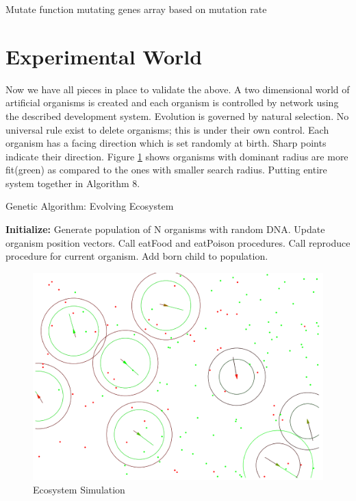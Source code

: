 \documentclass[conference]{IEEEtran}
\begin{document}
\begin{algorithm}
\caption{Mutate function mutating genes array based on mutation rate}
\begin{algorithmic} 
\ELSE
{}
\ENDIF
\ENDIF
\ENDFOR
\end{algorithmic}
\end{algorithm}

\section{Experimental World}
Now we have all pieces in place to validate the above. A two dimensional world of artificial organisms is created and each organism is controlled by network using the described development system. Evolution is governed by natural selection. No universal rule exist to delete organisms; this is under their own control. Each organism has a facing direction which is set randomly at birth. Sharp points indicate their direction. Figure \ref{fig:ecosystem} shows organisms with dominant radius are more fit(green) as compared to the ones with smaller search radius. Putting entire system together in Algorithm 8.
\begin{algorithm}
\caption{Genetic Algorithm: Evolving Ecosystem}
\begin{algorithmic} 
\STATE \textbf{Initialize:} Generate population of N organisms with random DNA.
\LOOP
{}                    
\STATE Update organism position vectors.
\STATE Call eatFood and eatPoison procedures.
\STATE Call reproduce procedure for current organism.
\STATE Add born child to population.
\ENDIF
\ENDFOR
\ENDLOOP
\end{algorithmic}
\end{algorithm}
\begin{figure}
	\includegraphics[scale=0.329]{ecosystem.png}
	\caption{Ecosystem Simulation}
	\label{fig:ecosystem}
\end{figure}
\end{document}
